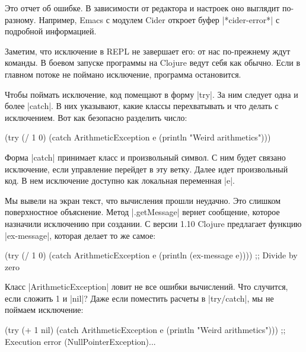 Это отчет об ошибке. В зависимости от редактора и настроек оно выглядит
по-разному. Например, Emacs с модулем Cider откроет буфер \spverb|*cider-error*|
с подробной информацией.

Заметим, что исключение в REPL не завершает его: от нас по-прежнему ждут
команды. В боевом запуске программы на Clojure ведут себя как обычно. Если в
главном потоке не поймано исключение, программа остановится.

Чтобы поймать исключение, код помещают в форму \spverb|try|. За ним следует одна
и более \spverb|catch|. В них указывают, какие классы перехватывать и что делать
с исключением. Вот как безопасно разделить число:

\begin{english}
  \begin{clojure}
(try
  (/ 1 0)
  (catch ArithmeticException e
    (println "Weird arithmetics")))
  \end{clojure}
\end{english}

Форма \spverb|catch| принимает класс и произвольный символ. С ним будет связано
исключение, если управление перейдет в эту ветку. Далее идет произвольный код. В
нем исключение доступно как локальная переменная \spverb|e|.

Мы вывели на экран текст, что вычисления прошли неудачно. Это слишком
поверхностное объяснение. Метод \spverb|.getMessage| вернет сообщение, которое
назначили исключению при создании. С версии 1.10 Clojure предлагает функцию
\spverb|ex-message|, которая делает то же самое:

\begin{english}
  \begin{clojure}
(try
  (/ 1 0)
  (catch ArithmeticException e
    (println (ex-message e))))
;; Divide by zero
  \end{clojure}
\end{english}

Класс \spverb|ArithmeticException| ловит не все ошибки вычислений. Что случится,
если сложить 1 и \spverb|nil|? Даже если поместить расчеты в \spverb|try/catch|,
мы не поймаем исключение:

\begin{english}
  \begin{clojure}
(try
  (+ 1 nil)
  (catch ArithmeticException e
    (println "Weird arithmetics")))
;; Execution error (NullPointerException)...
  \end{clojure}
\end{english}

